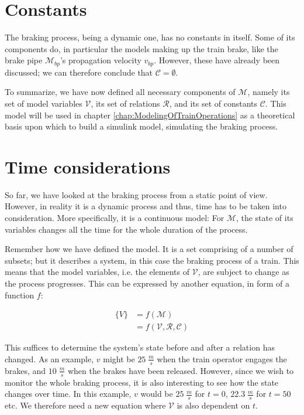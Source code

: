 \section{Constants}
\label{sec:Constants}
\par\noindent
The braking process, being a dynamic one, has no constants in itself. Some of its components do, in particular the models making up the train brake, like the brake pipe ${\mathcal{M}}_{bp}$'s propagation velocity $v_{bp}$. However, these have already been discussed; we can therefore conclude that ${\mathcal{C}} = \emptyset$.
\bigskip
\par\noindent
To summarize, we have now defined all necessary components of ${\mathcal{M}}$, namely its set of model variables ${\mathcal{V}}$, its set of relations ${\mathcal{R}}$, and its set of constants ${\mathcal{C}}$. This model will be used in chapter \ref{chap:ModelingOfTrainOperations} as a theoretical basis upon which to build a simulink model, simulating the braking process.

\section{Time considerations}
\label{sec:TimeConsiderations}
\par\noindent
So far, we have looked at the braking process from a static point of view. However, in reality it is a dynamic process and thus, time has to be taken into consideration. More specifically, it is a continuous model: For ${\mathcal{M}}$, the state of its variables changes all the time for the whole duration of the process. 
\par
Remember how we have defined the model. It is a set comprising of a number of subsets; but it describes a system, in this case the braking process of a train. This means that the model variables, i.e. the elements of ${\mathcal{V}}$, are subject to change as the process progresses. This can be expressed by another equation, in form of a function $f$:

\begin{align*}
\{ V \} &= f( {\mathcal{M}} ) \\
		&= f( {\mathcal{V}}, {\mathcal{R}}, {\mathcal{C}} )
\end{align*}

\noindent
This suffices to determine the system's state before and after a relation has changed. As an example, $v$ might be $25 \; \frac{m}{s}$ when the train operator engages the brakes, and $10 \; \frac{m}{s}$ when the brakes have been released. However, since we wish to monitor the whole braking process, it is also interesting to see how the state changes over time. In this example, $v$ would be $25 \; \frac{m}{s}$ for $t=0$, $22.3 \; \frac{m}{s}$ for $t=50$ etc. We therefore need a new equation where ${\mathcal{V}}$ is also dependent on $t$.

